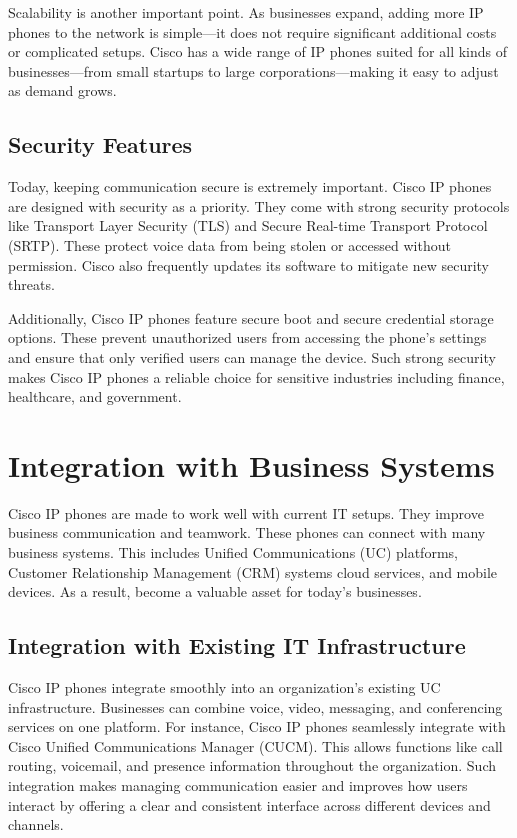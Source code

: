 \documentclass[11pt,a4paper]{article}
\begin{document}
Scalability is another important point. As businesses expand, adding more IP phones to the network is simple—it does not require significant additional costs or complicated setups. Cisco has a wide range of IP phones suited for all kinds of businesses—from small startups to large corporations—making it easy to adjust as demand grows.

\subsection*{Security Features}

Today, keeping communication secure is extremely important. Cisco IP phones are designed with security as a priority. They come with strong security protocols like Transport Layer Security (TLS) and Secure Real-time Transport Protocol (SRTP). These protect voice data from being stolen or accessed without permission. Cisco also frequently updates its software to mitigate new security threats.

Additionally, Cisco IP phones feature secure boot and secure credential storage options. These prevent unauthorized users from accessing the phone’s settings and ensure that only verified users can manage the device. Such strong security makes Cisco IP phones a reliable choice for sensitive industries including finance, healthcare, and government.

\section*{Integration with Business Systems}

Cisco IP phones are made to work well with current IT setups. They improve business communication and teamwork. These phones can connect with many business systems. This includes Unified Communications (UC) platforms, Customer Relationship Management (CRM) systems cloud services, and mobile devices. As a result, become a valuable asset for today’s businesses.

\subsection*{Integration with Existing IT Infrastructure}

Cisco IP phones integrate smoothly into an organization’s existing UC infrastructure. Businesses can combine voice, video, messaging, and conferencing services on one platform. For instance, Cisco IP phones seamlessly integrate with Cisco Unified Communications Manager (CUCM). This allows functions like call routing, voicemail, and presence information throughout the organization. Such integration makes managing communication easier and improves how users interact by offering a clear and consistent interface across different devices and channels.
\end{document}
